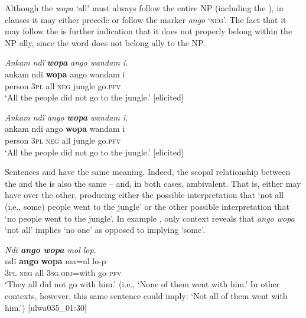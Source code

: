 Although the  \textit{wopa} ‘all’ must always follow the entire NP (including the ), in  clauses it may either precede  or follow  the  marker \textit{ango} ‘\textsc{neg}’. The fact that it may follow the  is further indication that it does not properly belong within the NP ally, since the  word does not belong ally to the NP.

\ea%
    \label{ex:det:174}
          \textit{Ankam ndï} \textbf{\textit{wopa}} \textit{ango wandam i.}\\
\gll    ankam  ndï  \textbf{wopa}  ango  wandam  i\\
    person  \textsc{3pl}  all    \textsc{neg}  jungle    go.\textsc{pfv}\\
\glt `All the people did not go to the jungle.’ [elicited]
\z

\ea%
    \label{ex:det:175}
          \textit{Ankam ndï ango} \textbf{\textit{wopa}} \textit{wandam i.}\\
\gll ankam  ndï  ango  \textbf{wopa}  wandam  i\\
    person  \textsc{3pl}  \textsc{neg}  all    jungle    go.\textsc{pfv}\\
\glt `All the people did not go to the jungle.’ [elicited]
\z

Sentences  and  have the same meaning. Indeed, the scopal relationship between the  and the  is also the same -- and, in both cases, ambivalent. That is, either may have  over the other, producing either the possible interpretation that ‘not all (i.e., some) people went to the jungle’ or the other possible interpretation that ‘no people went to the jungle’. In example , only context reveals that \textit{ango wopa} ‘not all’ implies ‘no one’ as opposed to implying ‘some’.

\ea%
    \label{ex:det:176}
          \textit{Ndï \textbf{ango wopa} mol lop.}\\
\gll    ndï  \textbf{ango}  \textbf{wopa}  ma=ul      lo-p\\
    3\textsc{pl}  \textsc{neg}  all    3\textsc{sg.obj=}with  go-\textsc{pfv}\\
\glt `They all did not go with him.’ (i.e., ‘None of them went with him.’ In other contexts, however, this same sentence could imply: ‘Not all of them went with him.’) [ulwa035\_01:30]
\z

